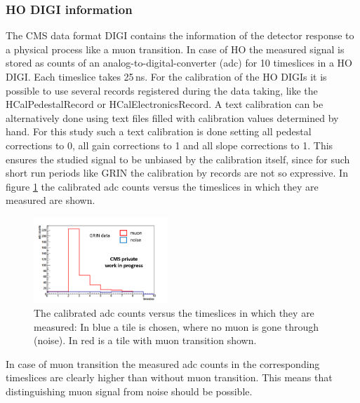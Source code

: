 		\subsubsection{HO DIGI information}
			The CMS data format DIGI contains the information of the detector response to a physical process like a muon transition.
			In case of HO the measured signal is stored as counts of an analog-to-digital-converter (adc) for 10 timeslices in a HO DIGI.
			Each timeslice takes 25\,ns.
			For the calibration of the HO DIGIs it is possible to use several records registered during the data taking, like the HCalPedestalRecord or HCalElectronicsRecord.
			A text calibration can be alternatively done using text files filled with calibration values determined by hand.
			For this study such a text calibration is done setting all pedestal corrections to 0, all gain corrections to 1 and all slope corrections to 1.
			This ensures the studied signal to be unbiased by the calibration itself, since for such short run periods like GRIN the calibration by records are not so expressive.
			In figure \ref{fig:adc_vs_ts} the calibrated adc counts versus the timeslices in which they are measured are shown.
			\begin{figure}[htbp]
				\centering
				\includegraphics[width=0.45\textwidth]{Figures/erdogan/adc_vs_ts.png}
				\caption{The calibrated adc counts versus the timeslices in which they are measured: In blue a tile is chosen, where no muon is gone through (noise). In red is a tile with muon transition shown.}
				\label{fig:adc_vs_ts}
			\end{figure}
			In case of muon transition the measured adc counts in the corresponding timeslices are clearly higher than without muon transition.
			This means that distinguishing muon signal from noise should be possible.
